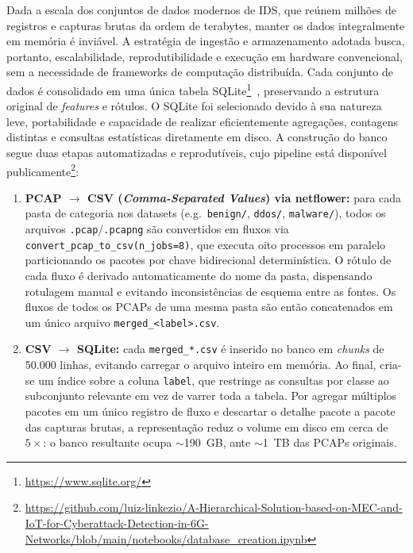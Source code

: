 \documentclass[12pt,a4paper]{article}
\begin{document}
Dada a escala dos conjuntos de dados modernos de IDS, que reúnem milhões de
registros e capturas brutas da ordem de terabytes, manter os dados
integralmente em memória é inviável. A estratégia de ingestão e armazenamento
adotada busca, portanto, escalabilidade, reprodutibilidade e execução em
hardware convencional, sem a necessidade de frameworks de computação
distribuída. Cada conjunto de dados é consolidado em uma única tabela
SQLite\footnote{\url{https://www.sqlite.org/}}~\cite{sqlite}, preservando a
estrutura original de \textit{features} e rótulos. O SQLite foi selecionado
devido à sua natureza leve, portabilidade e capacidade de realizar
eficientemente agregações, contagens distintas e consultas estatísticas
diretamente em disco. A construção do banco segue duas etapas automatizadas e
reprodutíveis, cujo pipeline está disponível
publicamente\footnote{\url{https://github.com/luiz-linkezio/A-Hierarchical-Solution-based-on-MEC-and-IoT-for-Cyberattack-Detection-in-6G-Networks/blob/main/notebooks/database_creation.ipynb}}:

\begin{enumerate}
  \item \textbf{PCAP $\rightarrow$ CSV (\textit{Comma-Separated Values}) via netflower:}
    para cada pasta de categoria nos datasets (e.g.\ \texttt{benign/},
    \texttt{ddos/}, \texttt{malware/}), todos os arquivos
    \texttt{.pcap}/\texttt{.pcapng} são convertidos em fluxos via
    \texttt{convert\_pcap\_to\_csv(n\_jobs=8)}, que executa oito processos em
    paralelo particionando os pacotes por chave bidirecional determinística. O
    rótulo de cada fluxo é derivado automaticamente do nome da pasta, dispensando
    rotulagem manual e evitando inconsistências de esquema entre as fontes. Os
    fluxos de todos os PCAPs de uma mesma pasta são então concatenados em um
    único arquivo \texttt{merged\_<label>.csv}.
  \item \textbf{CSV $\rightarrow$ SQLite:} cada \texttt{merged\_*.csv} é inserido
    no banco em \textit{chunks} de 50.000 linhas, evitando carregar o arquivo
    inteiro em memória. Ao final, cria-se um índice sobre a coluna
    \texttt{label}, que restringe as consultas por classe ao subconjunto relevante
    em vez de varrer toda a tabela. Por agregar múltiplos pacotes em um único
    registro de fluxo e descartar o detalhe pacote a pacote das capturas brutas,
    a representação reduz o volume em disco em cerca de $5\times$: o banco
    resultante ocupa $\sim$190~GB, ante $\sim$1~TB das PCAPs originais.
\end{enumerate}
\end{document}
